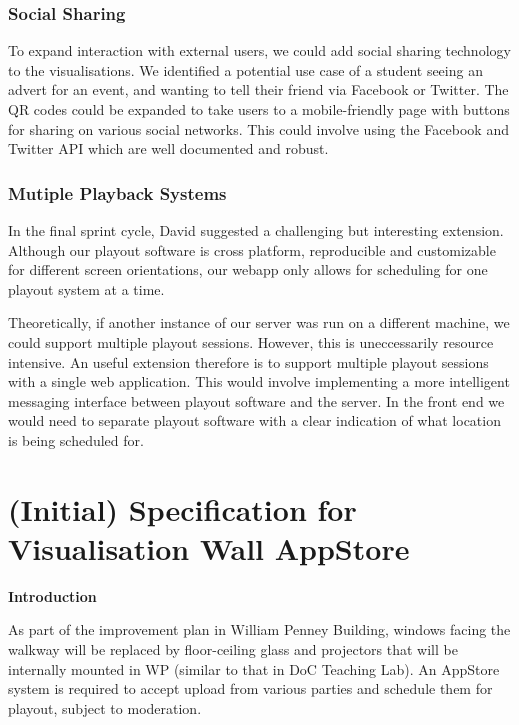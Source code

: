 \documentclass[a4paper, titlepage]{article}
\begin{document}
\subsubsection{Social Sharing}
To expand interaction with external users, we could add social sharing technology to the 
visualisations. We identified a potential use case of a student seeing an advert for an event, and 
wanting to tell their friend via Facebook or Twitter. The QR codes could be expanded to take users to
a mobile-friendly page with buttons for sharing on various social networks. This could involve using 
the Facebook and Twitter API which are well documented and robust. 


\subsubsection{Mutiple Playback Systems}
In the final sprint cycle, David suggested a challenging but interesting extension. Although our 
playout software is cross platform, reproducible and customizable for different screen orientations, 
our webapp only allows for scheduling for one playout system at a time. 

Theoretically, if another instance of our server was run on a different machine, we could support 
multiple playout sessions. However, this is uneccessarily resource intensive. An useful extension 
therefore is to support multiple playout sessions with a single web application. This would involve 
implementing a more intelligent messaging interface between playout software and the server. In the 
front end we would need to separate playout software with a clear indication of what location is
being scheduled for. 



\newpage
\appendix

\section{(Initial) Specification for Visualisation Wall AppStore}

\textbf{\Large Introduction}

As part of the improvement plan in William Penney Building, windows facing the walkway will be replaced by floor-ceiling glass and projectors that will be internally mounted in WP (similar to that in DoC Teaching Lab). An AppStore system is required to accept upload from various parties and schedule them for playout, subject to moderation.\\
\end{document}
